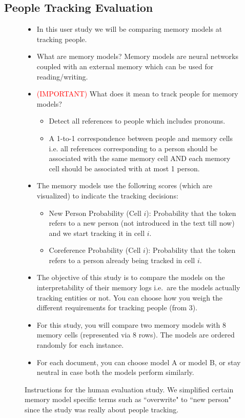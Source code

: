 \documentclass[12pt]{thesis-umich}[thesis]
\begin{document}
\subsection{People Tracking Evaluation}
\begin{figure}[!h]
\begin{mdframed}\begin{itemize}
    \item In this user study we will be comparing memory models at tracking people.
    \item What are memory models? Memory models are neural networks coupled with an external memory which can be used for reading/writing.
    \item \textcolor{red}{(IMPORTANT)} What does it mean to track people for memory models?
    \begin{itemize}
        \item Detect all references to people which includes pronouns.
        \item A 1-to-1 correspondence between people and memory cells i.e. all references corresponding to a person should be associated with the same memory cell AND each memory cell should be associated with at most 1 person.
    \end{itemize}

    \item The memory models use the following scores (which are visualized) to indicate the tracking decisions:
    \begin{itemize}
    \item New Person Probability (Cell $i$): Probability that the token refers to a new person (not introduced in the text till now) and we start tracking it in cell $i$.
    \item Coreference Probability (Cell $i$): Probability that the token refers to a person already being tracked in cell $i$.
    \end{itemize}
    \item The objective of this study is to compare the models on the interpretability of their memory logs i.e.\ are the models actually tracking entities or not. You can choose how you weigh the different requirements for tracking people (from 3).
    \item For this study, you will compare two memory models with 8 memory cells (represented via 8 rows). The models are ordered randomly for each instance.
    \item For each document, you can choose model A or model B, or stay neutral in case both the models perform similarly.
    \end{itemize}
\end{mdframed}
\caption{Instructions for the human evaluation study. We simplified certain memory model specific terms such as ``overwrite" to ``new person" since the study was really about people tracking.}
\label{fig:instructions}
\end{figure}
\end{document}

